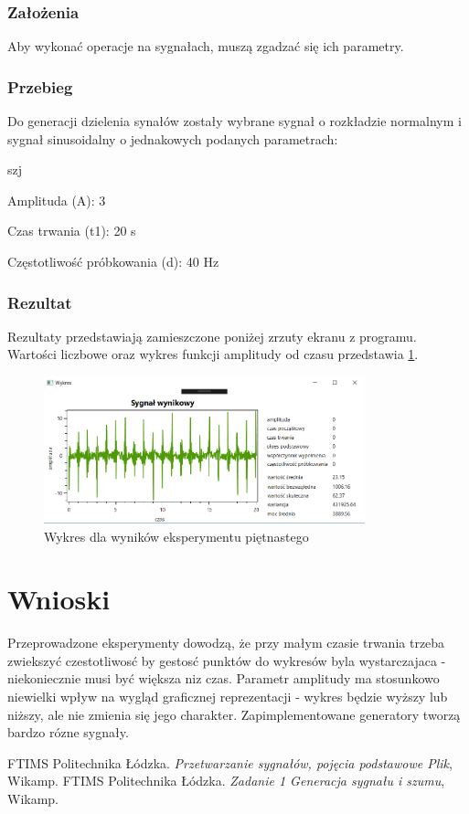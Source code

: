 \documentclass[12pt]{article}
\begin{document}
\subsubsection{Założenia}
Aby wykonać operacje na sygnałach, muszą zgadzać się ich parametry.

\subsubsection{Przebieg}
Do generacji dzielenia synałów zostały wybrane sygnał o rozkładzie normalnym i sygnał sinusoidalny o jednakowych podanych parametrach:

\begin{labeling}{szj}
\item [Amplituda (A):] 3
\item [Czas trwania (t1):] 20 s
\item [Częstotliwość próbkowania (d): ] 40 Hz
\end{labeling}

\subsubsection{Rezultat}
Rezultaty przedstawiają zamieszczone poniżej zrzuty ekranu z programu. Wartości liczbowe oraz wykres funkcji amplitudy od czasu przedstawia \ref{Wykres dla wyników eksperymentu piętnastego}.
\begin{figure}[h!]
 \centering
 \includegraphics[width=9.3cm]{DzielenieRozkSinA3t120d40h5.png}
 \vspace{-0.3cm}
 \caption{Wykres dla wyników eksperymentu piętnastego}
 \label{Wykres dla wyników eksperymentu piętnastego}
\end{figure}

\section{Wnioski}


Przeprowadzone eksperymenty dowodzą, że  przy małym czasie trwania trzeba zwiekszyć czestotliwosć by gestosć punktów do wykresów byla wystarczajaca - niekoniecznie musi być większa niz czas. Parametr amplitudy ma stosunkowo niewielki wpływ na wygląd graficznej reprezentacji - wykres będzie wyższy lub niższy, ale nie zmienia się jego charakter. Zapimplementowane generatory tworzą bardzo rózne sygnały. 

\begin{thebibliography}{0}
    FTIMS Politechnika Łódzka.
    \textsl{Przetwarzanie sygnałów, pojęcia podstawowe Plik}, Wikamp.
  FTIMS Politechnika Łódzka.
    \textsl{Zadanie 1 Generacja sygnału i szumu}, Wikamp.
\end{thebibliography}
\end{document}
